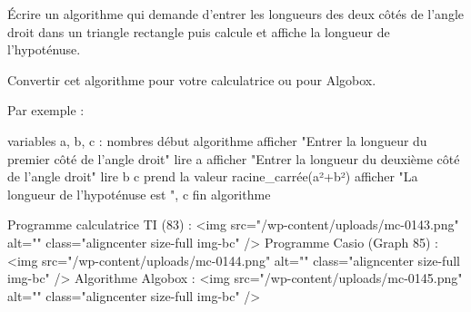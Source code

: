 
%
Écrire un algorithme qui demande d'entrer les longueurs des deux côtés de l'angle droit dans un triangle rectangle puis calcule et affiche la longueur de l'hypoténuse.
\par
Convertir cet algorithme pour votre calculatrice ou pour Algobox.
\begin{corrige}
     Par exemple :
\begin{code}
variables
   a, b, c : nombres
début algorithme
   afficher "Entrer la longueur du premier côté de l'angle droit"
   lire a
   afficher "Entrer la longueur du deuxième côté de l'angle droit"
   lire b
   c prend la valeur racine_carrée(a²+b²)
   afficher "La longueur de l'hypoténuse est ", c
fin algorithme
\end{code}
     Programme calculatrice TI (83) :
     <img src="/wp-content/uploads/mc-0143.png" alt="" class="aligncenter size-full  img-bc" />
     Programme Casio (Graph 85) :
     <img src="/wp-content/uploads/mc-0144.png" alt="" class="aligncenter size-full  img-bc" />
     Algorithme Algobox :
     <img src="/wp-content/uploads/mc-0145.png" alt="" class="aligncenter size-full  img-bc" />
\end{corrige}
